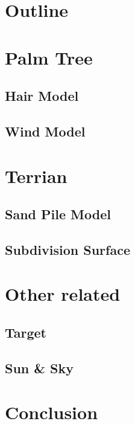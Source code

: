 \documentclass[11pt]{article}
\begin{document}
\section{Outline}



\section{Palm Tree}
\subsection{Hair Model}
\subsection{Wind Model}

\section{Terrian}
\subsection{Sand Pile Model}
\subsection{Subdivision Surface}

\section{Other related}
\subsection{Target}
\subsection{Sun \& Sky}

\section{Conclusion}
\end{document}
